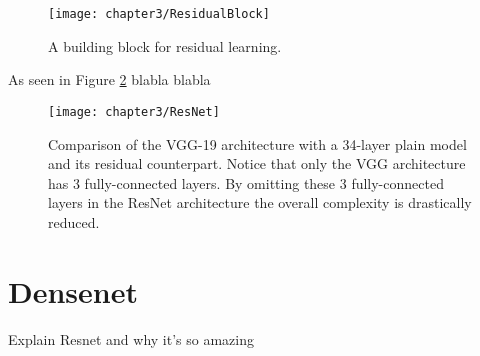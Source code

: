\begin{figure}[H]
  \centering
  \caption{A building block for residual learning. \cite{he2016deep}}
  \texttt{[image: chapter3/ResidualBlock]}
  \label{fig:ResidualBlock}
\end{figure}

As seen in Figure \ref{fig:ResNet} blabla blabla

\begin{figure}[H]
  \centering
  \caption{Comparison of the VGG-19 architecture with a 34-layer plain model and its residual counterpart. Notice that only the VGG architecture has 3 fully-connected layers. By omitting these 3 fully-connected layers in the ResNet architecture the overall complexity is drastically reduced. \cite{he2016deep}}
  \texttt{[image: chapter3/ResNet]}
  \label{fig:ResNet}
\end{figure}

\section{Densenet}

Explain Resnet and why it's so amazing

